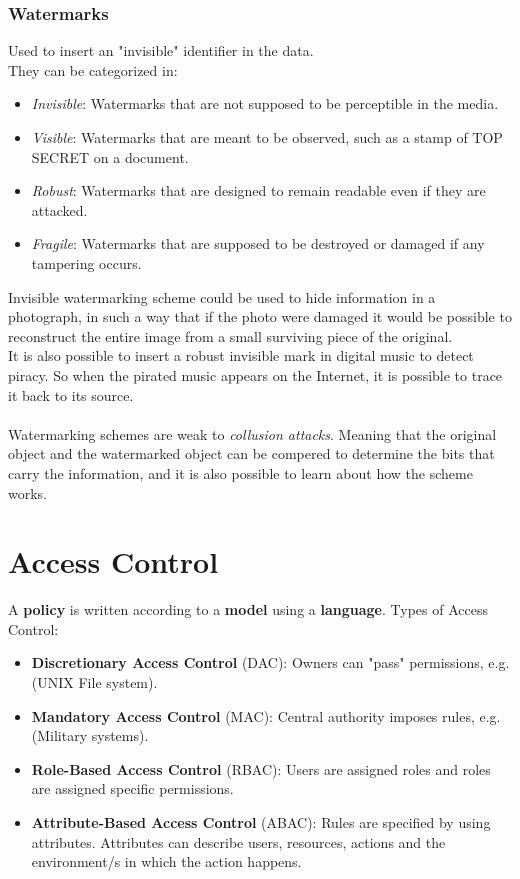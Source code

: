 \documentclass{article}
\begin{document}
\subsubsection{Watermarks}
Used to insert an "invisible" identifier in the data.\\
They can be categorized in:
\begin{itemize}
    \item \textit{Invisible}: Watermarks that are not supposed to be perceptible in the media.
    \item \textit{Visible}: Watermarks that are meant to be observed, such as a stamp of TOP SECRET on a document.
    \item \textit{Robust}: Watermarks that are designed to remain readable even if they are attacked.
    \item \textit{Fragile}: Watermarks that are supposed to be destroyed or damaged if any tampering occurs.
\end{itemize}
Invisible watermarking scheme could be used to hide information in a photograph, in such a way that if the photo were damaged it would be possible to reconstruct the entire image from a small surviving piece of the original.\\
It is also possible to insert a robust invisible mark in digital music to detect piracy. So when the pirated music appears on the Internet, it is possible to trace it back to its source.\\\\
Watermarking schemes are weak to \textit{collusion attacks}. Meaning that the original object and the watermarked object can be compered to determine the bits that carry the information, and it is also possible to learn about how the scheme works.

\newpage
\section{Access Control}
A \textbf{policy} is written according to a \textbf{model} using a \textbf{language}.
Types of Access Control:
\begin{itemize}
    \item \textbf{Discretionary Access Control} (DAC): Owners can "pass" permissions, e.g. (UNIX File system).
    \item \textbf{Mandatory Access Control} (MAC): Central authority imposes rules, e.g. (Military systems).
    \item \textbf{Role-Based Access Control} (RBAC): Users are assigned roles and roles are assigned specific permissions.
    \item \textbf{Attribute-Based Access Control} (ABAC): Rules are specified by using attributes. Attributes can describe users, resources, actions and the environment/s in which the action happens.
\end{itemize}
\end{document}
